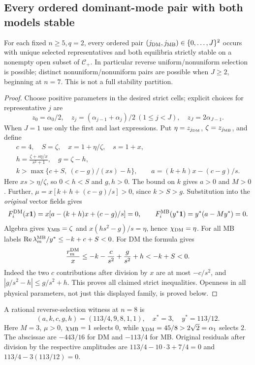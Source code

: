 \subsection{Every ordered dominant-mode pair with both models stable}
\begin{theorem}
\label{thm:P08-pair-realization}
For each fixed $n\ge5,q=2$, every ordered pair
$(j_{\mathrm{DM}},j_{\mathrm{MB}})\in\{0,\ldots,J\}^2$ occurs with unique selected
representatives and both equilibria strictly stable on a nonempty open
subset of $\mathcal C_+$. In particular reverse uniform/nonuniform
selection is possible; distinct nonuniform/nonuniform pairs are possible
when $J\ge2$, beginning at $n=7$. This is not a full stability partition.
\end{theorem}
\begin{proof}
Choose positive parameters in the desired strict cells; explicit choices
for representative $j$ are
\[
 z_0=\alpha_0/2,\quad
 z_j=(\alpha_{j-1}+\alpha_j)/2\ (1\le j<J),\quad
 z_J=2\alpha_{J-1}.
\]
When $J=1$ use only the first and last expressions. Put
$\eta=z_{j_{\mathrm{DM}}}$, $\zeta=z_{j_{\mathrm{MB}}}$, and define
\begin{equation}
\begin{gathered}
 c=4,\quad S=\zeta,\quad x=1+\eta/\zeta,\quad s=1+x,\\
 h=\frac{\zeta+s\eta/x}{s^2+1},\quad g=\zeta-h,\\
 k>\max\{c+S,\ (c-g)/(xs)-h\},\qquad
 a=(k+h)x-(c-g)/s.
\end{gathered}\label{eq:P08-pair-construction}
\end{equation}
Here $xs>\eta/\zeta$, so $0<h<S$ and $g,h>0$. The bound on $k$
gives $a>0$ and $M>0$. Further,
$\mu=x[k+h+(c-g)/s]>0$, since $k>S>g$. Substitution into the
\emph{original} vector fields gives
\begin{equation}
 F_i^{\mathrm{DM}}(x\mathbf{1})=x[a-(k+h)x+(c-g)/s]=0,\qquad
 F_i^{\mathrm{MB}}(y^*\mathbf{1})=y^*(a-My^*)=0.
 \label{eq:P08-residual-general}
\end{equation}
Algebra gives $\chi_{\mathrm{MB}}=\zeta$ and
$x(hs^2-g)/s=\eta$, hence $\chi_{\mathrm{DM}}=\eta$.
For all MB labels $\operatorname{Re}\lambda_m^{\mathrm{MB}}/y^*\le-k+c+S<0$.
For DM the formula gives
\begin{equation}
 \frac{r_m^{\mathrm{DM}}}x
 \le-k-\frac{c}{s^2}+\frac{g}{s^2}+h<-k+S<0.
 \label{eq:P08-DM-bound}
\end{equation}
Indeed the two $c$ contributions after division by $x$ are at most
$-c/s^2$, and $|g/s^2-h|\le g/s^2+h$. This proves all claimed
strict inequalities. Openness in all physical parameters, not just this
displayed family, is proved below.
\end{proof}
A rational reverse-selection witness at $n=8$ is
\begin{equation}
 (a,k,c,g,h)=(113/4,9,8,1,1),\quad x^*=3,\quad y^*=113/12.
 \label{eq:P08-reverse-selection-example}
\end{equation}
Here $M=3$, $\mu>0$, $\chi_{\mathrm{MB}}=1$ selects $0$, while
$\chi_{\mathrm{DM}}=45/8>2\sqrt2=\alpha_1$ selects $2$.
The abscissae are $-443/16$ for DM and $-113/4$ for MB.
Original residuals after division by the respective amplitudes are
$113/4-10\cdot3+7/4=0$ and $113/4-3(113/12)=0$.

